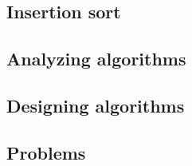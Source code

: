 
\subsection{Insertion sort}


\subsection{Analyzing algorithms}


\subsection{Designing algorithms}


\subsection*{Problems}

